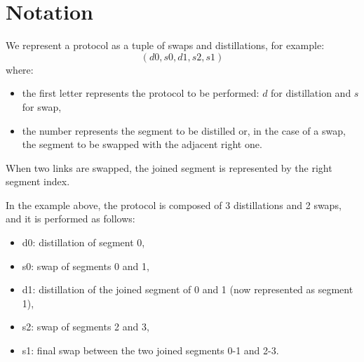 \documentclass{article}
\begin{document}
\section*{Notation}

We represent a protocol as a tuple of swaps and distillations, for example:
\begin{equation*}
    (d0, s0, d1, s2, s1)
\end{equation*}
where:
\begin{itemize}
    \item the first letter represents the protocol to be performed: \(d\) for distillation and \(s\) for swap,
    \item the number represents the segment to be distilled or, in the case of a swap, the segment to be swapped with the adjacent right one.
\end{itemize}

When two links are swapped, the joined segment is represented by the right segment index.

In the example above, the protocol is composed of 3 distillations and 2 swaps, and it is performed as follows:
\begin{itemize}
    \item d0: distillation of segment 0,
    \item s0: swap of segments 0 and 1,
    \item d1: distillation of the joined segment of 0 and 1 (now represented as segment 1),
    \item s2: swap of segments 2 and 3,
    \item s1: final swap between the two joined segments 0-1 and 2-3.
\end{itemize}
\end{document}
